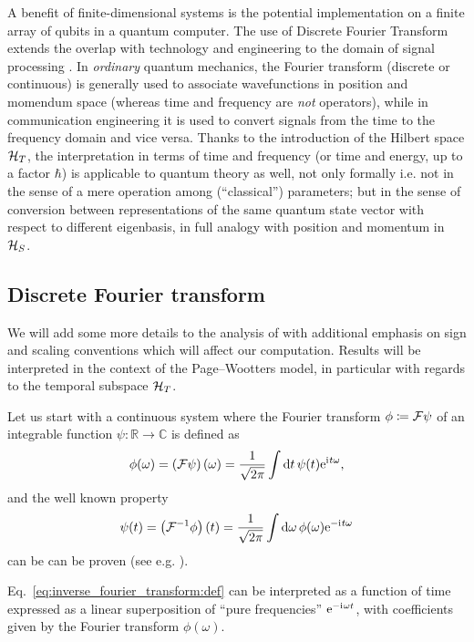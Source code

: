 A benefit of finite-dimensional systems is the potential implementation on a finite array of
qubits in a quantum computer. The use of Discrete Fourier Transform extends the overlap
with technology and engineering to the domain of signal processing \parencite{FiniteHilb}.
In \emph{ordinary} quantum mechanics, the Fourier transform (discrete or continuous)
is generally used
to associate wavefunctions in position and momendum space
(whereas time and frequency are \emph{not} operators),
while in communication engineering it is used to convert signals
from the time to the frequency domain and vice versa.
Thanks to the introduction of the Hilbert space $\mathcal{H}_T$,
the interpretation in terms of time and frequency
(or time and energy, up to a factor $\hbar$)
is applicable to quantum theory as well, not only formally
i.e. not in the sense of a mere operation among (``classical'') parameters;
but in the sense of conversion between representations of the
same quantum state vector with respect to different eigenbasis,
in full analogy with position and momentum in $\mathcal{H}_S$.

\subsection{Discrete Fourier transform}

We will add some more details to the analysis of \citereset\cite{FiniteHilb} with
additional emphasis on sign and scaling conventions which will affect
our computation. Results will be interpreted in the context of
the Page--Wootters model, in particular with regards to the temporal subspace
$\mathcal{H}_T$.

Let us start with a continuous system where the Fourier transform $\phi \coloneqq \mathcal{F}\psi$ of
an integrable function $\psi: \mathbb{R} \to \mathbb{C}$ is defined as
\begin{equation}\label{eq:fourier_transform:def}
  \phi(\omega) = \left(\mathcal{F}\psi\right) (\omega) =
    \frac{1}{\sqrt{2\pi}} \int \dd{t} \psi(t) \mathrm{e}^{\mathrm{i}\mkern1mu t \omega} \text{,}
\end{equation}
and the well known  property
\begin{equation}\label{eq:inverse_fourier_transform:def}
  \psi(t) = \left(\mathcal{F}^{-1} \phi \right) (t) =
    \frac{1}{\sqrt{2\pi}} \int \dd{\omega} \phi(\omega) \mathrm{e}^{ - \mathrm{i}\mkern1mu t \omega}
\end{equation}
can be can be proven (see e.g. \cite{Folland:Fourier}).

Eq.~\eqref{eq:inverse_fourier_transform:def} can be interpreted
as a function of time
expressed as a linear superposition
of ``pure frequencies'' $\mathrm{e}^{-\mathrm{i}\mkern1mu \omega t}$,
with coefficients given by the Fourier transform $\phi(\omega)$.

